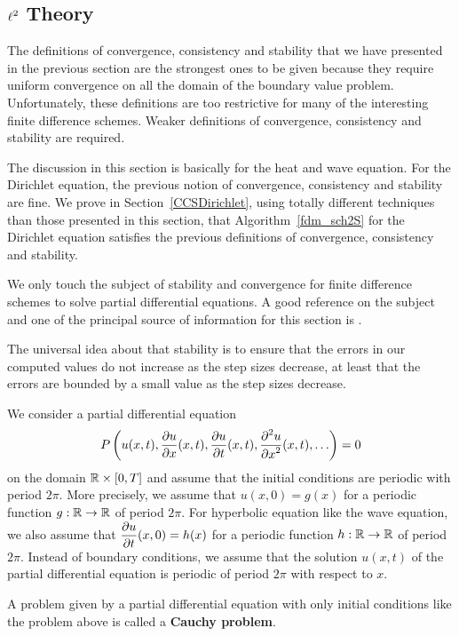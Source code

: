 \subsection{$\displaystyle \ell^2$ Theory} \label{ell2Theory}

The definitions of convergence, consistency and stability that we have
presented in the previous section are the strongest ones to be given
because they require uniform convergence on all the domain of the
boundary value problem.  Unfortunately, these definitions are too
restrictive for many of the interesting finite difference schemes.
Weaker definitions of convergence, consistency and stability are
required.

The discussion in this section is basically for the heat and wave
equation.  For the Dirichlet equation, the previous notion of
convergence, consistency and stability are fine.  We prove in
Section~\ref{CCSDirichlet}, using totally different techniques than
those presented in this section, that Algorithm~\ref{fdm_sch2S}
for the Dirichlet equation satisfies the previous definitions of
convergence, consistency and stability.

We only touch the subject of stability and convergence for finite
difference schemes to solve partial differential equations.  A good
reference on the subject and one of the principal source of
information for this section is \cite{WH}.  

The universal idea about that stability is to ensure that the errors
in our computed values do not increase as the step sizes decrease,
at least that the errors are bounded by a small value as the step sizes
decrease.

We consider a partial differential equation
\[
P\left(u(x,t), \frac{\partial{u}}{\partial{x}}(x,t), \frac{\partial{u}}{\partial{t}}(x,t),
\frac{\displaystyle \partial^{2}{u}} {\displaystyle \partial{x}^{2}}(x,t), \ldots \right)= 0
\]
on the domain $\mathbb{R} \times [0,T]$ and assume that the initial
conditions are periodic with period $2\pi$.  More precisely, we assume
that $u(x,0) = g(x)$ for a periodic function $g:\mathbb{R}\to \mathbb{R}$ of period
$2\pi$.  For hyperbolic equation like the wave equation, we also
assume that $\displaystyle \frac{\partial{u}}{\partial{t}}(x,0) = h(x)$ for a periodic
function $h:\mathbb{R}\to \mathbb{R}$ of period $2\pi$.   Instead of boundary
conditions, we assume that the solution $u(x,t)$ of the partial
differential equation is periodic of period $2\pi$ with respect to
$x$.

A problem given by a partial differential equation with only initial
conditions like the problem above is called a {\bfseries Cauchy
problem}.

